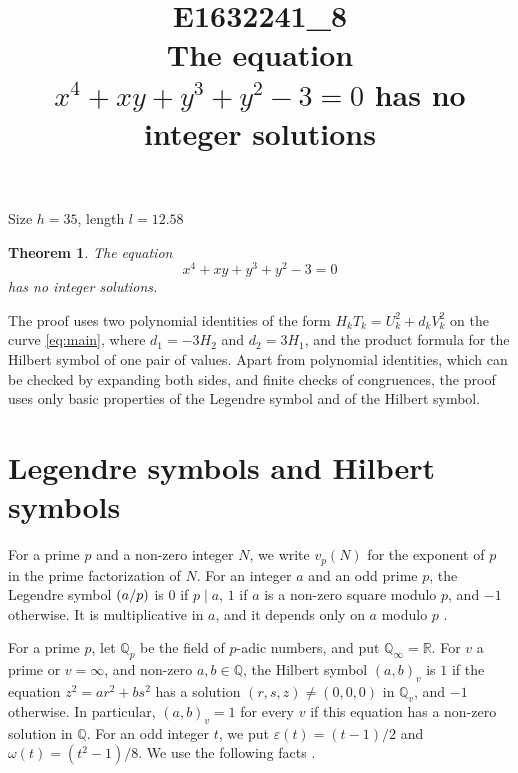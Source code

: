\documentclass[11pt]{article}
\title{\textbf{E1632241\_8}\\[4pt] {\Large The equation $x^{4}+xy+y^{3}+y^{2}-3=0$ has no integer solutions}}
\author{}
\date{}
\newtheorem{theorem}{Theorem}
\newcommand{\Q}{\mathbb{Q}}
\newcommand{\leg}[2]{\mathchoice{\biggl(\dfrac{#1}{#2}\biggr)}{(#1/#2)}{(#1/#2)}{(#1/#2)}}
\begin{document}
\maketitle
\vspace{-8ex}
\begin{center}
Size $h=35$, length $l=12.58$
\end{center}

\begin{theorem}\label{thm:main}
The equation
\begin{equation}\label{eq:main}
x^{4}+xy+y^{3}+y^{2}-3=0
\end{equation}
has no integer solutions.
\end{theorem}

The proof uses two polynomial identities of the form $H_kT_k=U_k^2+d_kV_k^2$ on the curve \eqref{eq:main}, where $d_{1}=-3H_{2}$ and $d_{2}=3H_{1}$, and the product formula for the Hilbert symbol of one pair of values. Apart from polynomial identities, which can be checked by expanding both sides, and finite checks of congruences, the proof uses only basic properties of the Legendre symbol and of the Hilbert symbol.

\section{Legendre symbols and Hilbert symbols}

For a prime $p$ and a non-zero integer $N$, we write $v_p(N)$ for the exponent of $p$ in the prime factorization of $N$. For an integer $a$ and an odd prime $p$, the Legendre symbol $\leg{a}{p}$ is $0$ if $p\mid a$, $1$ if $a$ is a non-zero square modulo $p$, and $-1$ otherwise. It is multiplicative in $a$, and it depends only on $a$ modulo $p$ \cite[Chapter~5]{IR}.

For a prime $p$, let $\Q_p$ be the field of $p$-adic numbers, and put $\Q_\infty=\mathbb R$. For $v$ a prime or $v=\infty$, and non-zero $a,b\in\Q$, the Hilbert symbol $(a,b)_v$ is $1$ if the equation $z^2=ar^2+bs^2$ has a solution $(r,s,z)\neq(0,0,0)$ in $\Q_v$, and $-1$ otherwise. In particular, $(a,b)_v=1$ for every $v$ if this equation has a non-zero solution in $\Q$. For an odd integer $t$, we put $\varepsilon(t)=(t-1)/2$ and $\omega(t)=(t^2-1)/8$. We use the following facts \cite[Chapter~III, Proposition~2 and Theorems~1 and~3]{Se}.
\end{document}
